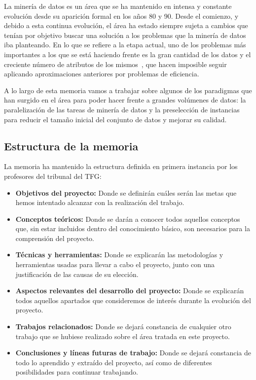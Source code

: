 \label{chap:Introduccion}


La minería de datos es un área que se ha mantenido en intensa y constante evolución desde su aparición formal en los años 80 y 90. Desde el comienzo, y debido a esta continua evolución, el área ha estado siempre sujeta a cambios que tenían por objetivo buscar una solución a los problemas que la minería de datos iba planteando. En lo que se refiere a la etapa actual, uno de los problemas más importantes a los que se está haciendo frente es la gran cantidad de los datos y el creciente número de atributos de los mismos~\cite{DataMiningConcepts}, que hacen imposible seguir aplicando aproximaciones anteriores por problemas de eficiencia.

A lo largo de esta memoria vamos a trabajar sobre algunos de los paradigmas que han surgido en el área para poder hacer frente a grandes volúmenes de datos: la paralelización de las tareas de minería de datos y la preselección de instancias para reducir el tamaño inicial del conjunto de datos y mejorar su calidad. 

\subsection{Estructura de la memoria}
	La memoria ha mantenido la estructura definida en primera instancia por los profesores del tribunal del TFG:
	\begin{itemize}
	\item \textbf{Objetivos del proyecto:} Donde se definirán cuáles serán las metas que hemos intentado alcanzar con la realización del trabajo.
	\item \textbf{Conceptos teóricos:} Donde se darán a conocer todos aquellos conceptos que, sin estar incluidos dentro del conocimiento básico, son necesarios para la comprensión del proyecto.
	\item \textbf{Técnicas y herramientas:} Donde se explicarán las metodologías  y herramientas usadas para llevar a cabo el proyecto, junto con una justificación de las causas de su elección.
	\item \textbf{Aspectos relevantes del desarrollo del proyecto:} Donde se explicarán todos aquellos apartados que consideremos de interés durante la evolución del proyecto.
	\item \textbf{Trabajos relacionados:} Donde se dejará constancia de cualquier otro trabajo que se hubiese realizado sobre el área tratada en este proyecto.
	\item \textbf{Conclusiones y líneas futuras de trabajo:} Donde se dejará constancia de todo lo aprendido y extraído del proyecto, así como de diferentes posibilidades para continuar trabajando.
	\end{itemize}
	
